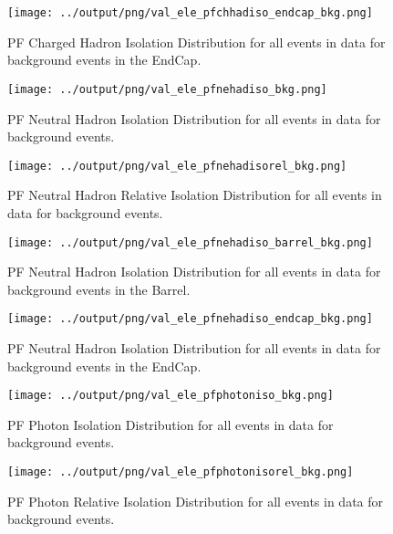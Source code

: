 \documentclass[11pt]{book}
\begin{document}
\begin{figure}[htb]
\centering
\texttt{[image: ../output/png/val\_ele\_pfchhadiso\_endcap\_bkg.png]}
\caption{PF Charged Hadron Isolation Distribution for all events in data for background events in the EndCap.}
\label{fig:val_ele_pfchhadiso_endcap_bkg}
\end{figure}


\begin{figure}[htb]
\centering
\texttt{[image: ../output/png/val\_ele\_pfnehadiso\_bkg.png]}
\caption{PF Neutral Hadron Isolation Distribution for all events in data for background events.}
\label{fig:val_ele_pfnehadiso_bkg}
\end{figure}

\begin{figure}[htb]
\centering
\texttt{[image: ../output/png/val\_ele\_pfnehadisorel\_bkg.png]}
\caption{PF Neutral Hadron Relative Isolation Distribution for all events in data for background events.}
\label{fig:val_ele_pfnehadisorel_bkg}
\end{figure}

\begin{figure}[htb]
\centering
\texttt{[image: ../output/png/val\_ele\_pfnehadiso\_barrel\_bkg.png]}
\caption{PF Neutral Hadron Isolation Distribution for all events in data for background events in the Barrel.}
\label{fig:val_ele_pfnehadiso_barrel_bkg}
\end{figure}

\begin{figure}[htb]
\centering
\texttt{[image: ../output/png/val\_ele\_pfnehadiso\_endcap\_bkg.png]}
\caption{PF Neutral Hadron Isolation Distribution for all events in data for background events in the EndCap.}
\label{fig:val_ele_pfnehadiso_endcap_bkg}
\end{figure}

\begin{figure}[htb]
\centering
\texttt{[image: ../output/png/val\_ele\_pfphotoniso\_bkg.png]}
\caption{PF Photon Isolation Distribution for all events in data for background events.}
\label{fig:val_ele_pfphotoniso_bkg}
\end{figure}

\begin{figure}[htb]
\centering
\texttt{[image: ../output/png/val\_ele\_pfphotonisorel\_bkg.png]}
\caption{PF Photon Relative Isolation Distribution for all events in data for background events.}
\label{fig:val_ele_pfphotonisorel_bkg}
\end{figure}
\end{document}
